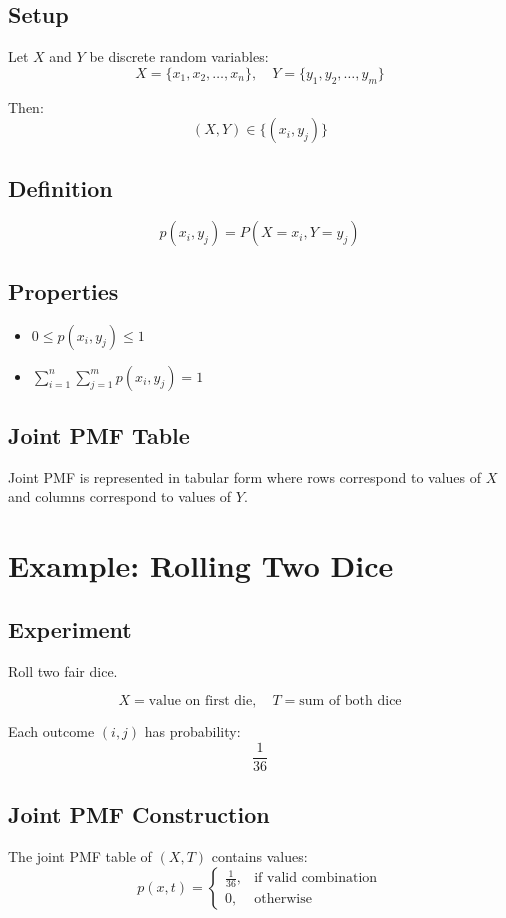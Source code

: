 \documentclass[12pt]{article}
\begin{document}
\subsection{Setup}
Let $X$ and $Y$ be discrete random variables:
\[
X = \{x_1, x_2, \dots, x_n\}, \quad Y = \{y_1, y_2, \dots, y_m\}
\]

Then:
\[
(X,Y) \in \{(x_i, y_j)\}
\]

\subsection{Definition}
\[
p(x_i, y_j) = P(X = x_i, Y = y_j)
\]

\subsection{Properties}
\begin{itemize}
    \item $0 \leq p(x_i, y_j) \leq 1$
    \item $\sum_{i=1}^{n} \sum_{j=1}^{m} p(x_i, y_j) = 1$
\end{itemize}

\subsection{Joint PMF Table}
Joint PMF is represented in tabular form where rows correspond to values of $X$ and columns correspond to values of $Y$.

\section{Example: Rolling Two Dice}

\subsection{Experiment}
Roll two fair dice.

\[
X = \text{value on first die}, \quad T = \text{sum of both dice}
\]

Each outcome $(i,j)$ has probability:
\[
\frac{1}{36}
\]

\subsection{Joint PMF Construction}
The joint PMF table of $(X,T)$ contains values:
\[
p(x,t) =
\begin{cases}
\frac{1}{36}, & \text{if valid combination} \\
0, & \text{otherwise}
\end{cases}
\]
\end{document}
